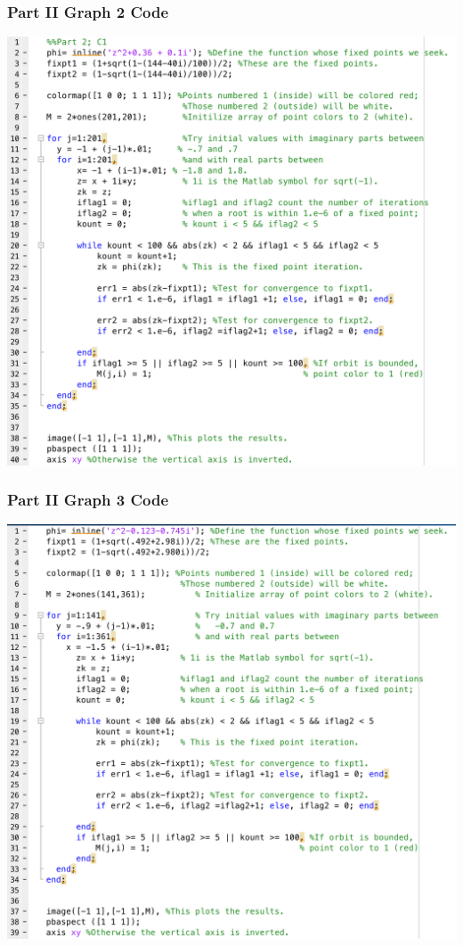 \documentclass[11pt]{article}
\theoremstyle{plain}
\theoremstyle{definition}
\begin{document}
\subsubsection*{Part II Graph 2 Code}
\includegraphics*[scale = 0.35]{Part2bCode.png}
\subsubsection*{Part II Graph 3 Code}
\includegraphics*[scale = 0.35]{Part2cCode.png}
\end{document}
